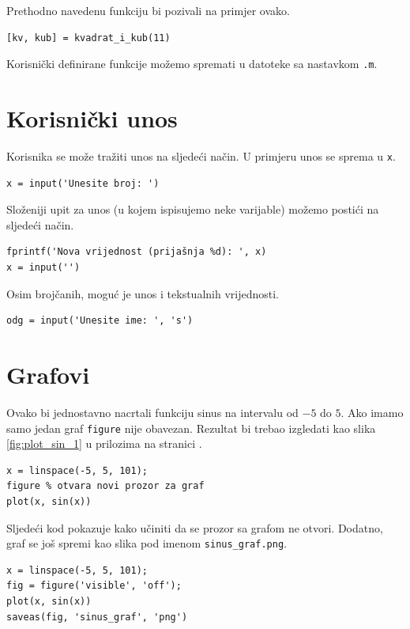 \documentclass[a4paper, 10pt]{article}
\begin{document}
Prethodno navedenu funkciju bi pozivali na primjer ovako.

\begin{lstlisting}
[kv, kub] = kvadrat_i_kub(11)
\end{lstlisting}

Korisnički definirane funkcije možemo spremati u datoteke sa nastavkom \texttt{.m}.

\section{Korisnički unos}

Korisnika se može tražiti unos na sljedeći način. U primjeru unos se sprema u \texttt{x}.

\begin{lstlisting}
x = input('Unesite broj: ')
\end{lstlisting}

Složeniji upit za unos (u kojem ispisujemo neke varijable) možemo postići na sljedeći način.

\begin{lstlisting}
fprintf('Nova vrijednost (prijašnja %d): ', x)
x = input('')
\end{lstlisting}

Osim brojčanih, moguć je unos i tekstualnih vrijednosti.

\begin{lstlisting}
odg = input('Unesite ime: ', 's')
\end{lstlisting}

\section{Grafovi}

Ovako bi jednostavno nacrtali funkciju sinus na intervalu od $-5$ do $5$. Ako imamo samo jedan graf \texttt{figure} nije obavezan. Rezultat bi trebao izgledati kao slika \ref{fig:plot_sin_1} u prilozima na stranici \pageref{sec:prilozi}.

\begin{lstlisting}
x = linspace(-5, 5, 101);
figure % otvara novi prozor za graf
plot(x, sin(x))
\end{lstlisting}

Sljedeći kod pokazuje kako učiniti da se prozor sa grafom ne otvori. Dodatno, graf se još spremi kao slika pod imenom \texttt{sinus\_graf.png}.

\begin{lstlisting}
x = linspace(-5, 5, 101);
fig = figure('visible', 'off');
plot(x, sin(x))
saveas(fig, 'sinus_graf', 'png')
\end{lstlisting}
\end{document}
